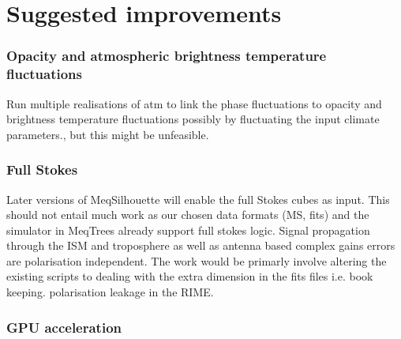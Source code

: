 \section{Suggested improvements}

\subsubsection{Opacity and atmospheric brightness temperature fluctuations}

Run multiple realisations of atm to link the phase fluctuations to opacity and brightness temperature fluctuations possibly by fluctuating the input climate parameters., but this might be unfeasible.

\subsubsection{Full Stokes}

Later versions of {\sc MeqSilhouette} will enable the full Stokes cubes as input. This should not entail much work as our chosen data formats (MS, {\sc fits}) and the simulator in {\sc MeqTrees} already support full stokes logic. Signal propagation through the ISM and troposphere as well as antenna based complex gains errors are polarisation independent. The work would be primarly involve altering the existing scripts to dealing with the extra dimension in the {\sc fits} files i.e. book keeping. 
polarisation leakage in the RIME.

\subsubsection{GPU acceleration}





